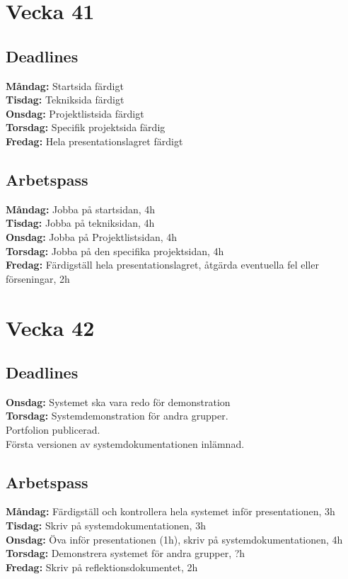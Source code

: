 \documentclass{TDP003mall}
\begin{document}
\section*{Vecka 41}
\subsection*{Deadlines}
\textbf{Måndag: }Startsida färdigt\\ 
\textbf{Tisdag: }Tekniksida färdigt\\
\textbf{Onsdag: }Projektlistsida färdigt\\
\textbf{Torsdag: }Specifik projektsida färdig\\
\textbf{Fredag: }Hela presentationslagret färdigt\\
\subsection*{Arbetspass}
\textbf{Måndag: }Jobba på startsidan, 4h\\
\textbf{Tisdag: }Jobba på tekniksidan, 4h\\
\textbf{Onsdag: }Jobba på Projektlistsidan, 4h\\
\textbf{Torsdag: }Jobba på den specifika projektsidan, 4h\\
\textbf{Fredag: }Färdigställ hela presentationslagret, åtgärda eventuella fel eller förseningar, 2h


\section*{Vecka 42}
\subsection*{Deadlines}
\textbf{Onsdag: }Systemet ska vara redo för demonstration\\
\textbf{Torsdag: }Systemdemonstration för andra grupper.\\
\-\hspace{47pt}Portfolion publicerad.\\
\-\hspace{47pt}Första versionen av systemdokumentationen inlämnad.

\subsection*{Arbetspass}
\textbf{Måndag: }Färdigställ och kontrollera hela systemet inför presentationen, 3h\\
\textbf{Tisdag: }Skriv på systemdokumentationen, 3h\\
\textbf{Onsdag: }Öva inför presentationen (1h), skriv på systemdokumentationen, 4h\\
\textbf{Torsdag: }Demonstrera systemet för andra grupper, ?h\\
\textbf{Fredag: }Skriv på reflektionsdokumentet, 2h
\end{document}
